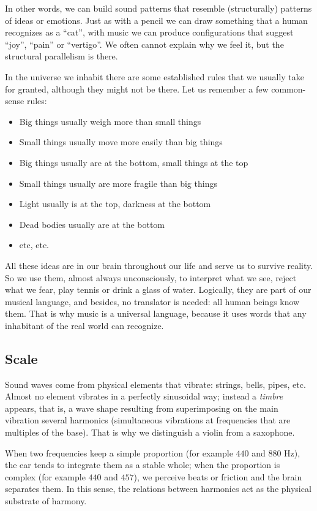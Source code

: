 \documentclass[]{report}
\providecommand{\tightlist}{%
  \setlength{\itemsep}{0pt}
  \setlength{\parskip}{0pt}
}
\begin{document}
In other words, we can build sound patterns that resemble (structurally) patterns of ideas or emotions. Just as with a pencil we can draw something that a human recognizes as a ``cat'', with music we can produce configurations that suggest ``joy'', ``pain'' or ``vertigo''. We often cannot explain why we feel it, but the structural parallelism is there.

In the universe we inhabit there are some established rules that we usually take for granted, although they might not be there. Let us remember a few common-sense rules:

\begin{itemize}
	\tightlist%
	\item Big things usually weigh more than small things
	\item Small things usually move more easily than big things
	\item Big things usually are at the bottom, small things at the top
	\item Small things usually are more fragile than big things
	\item Light usually is at the top, darkness at the bottom
	\item Dead bodies usually are at the bottom
	\item etc, etc.
\end{itemize}

All these ideas are in our brain throughout our life and serve us to survive reality. So we use them, almost always unconsciously, to interpret what we see, reject what we fear, play tennis or drink a glass of water. Logically, they are part of our musical language, and besides, no translator is needed: all human beings know them. That is why music is a universal language, because it uses words that any inhabitant of the real world can recognize.

\subsection{Scale}

Sound waves come from physical elements that vibrate: strings, bells, pipes, etc. Almost no element vibrates in a perfectly sinusoidal way; instead a \emph{timbre} appears, that is, a wave shape resulting from superimposing on the main vibration several harmonics (simultaneous vibrations at frequencies that are multiples of the base). That is why we distinguish a violin from a saxophone.

When two frequencies keep a simple proportion (for example $440$ and $880$ Hz), the ear tends to integrate them as a stable whole; when the proportion is complex (for example $440$ and $457$), we perceive beats or friction and the brain separates them. In this sense, the relations between harmonics act as the physical substrate of harmony.
\end{document}
